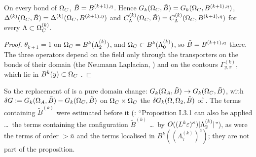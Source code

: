 \begin{lemma}\label{lem:a07:C51}
On every bond of $\Omega_{C}$, $\tilde B=B^{(k+1),\eta}$. Hence $G_k(\Omega_{C},\tilde B)=G_k(\Omega_{C},B^{(k+1),\eta})$, $\Delta^{(k)}(\Omega_{C},\tilde B)=\Delta^{(k)}(\Omega_{C},B^{(k+1),\eta})$ and $C^{(k)}_\Lambda(\Omega_{C},\tilde B)=C^{(k)}_\Lambda(\Omega_{C},B^{(k+1),\eta})$ for every $\Lambda\subset\Omega_{C}^{(k)}$.
\end{lemma}
\begin{proof}
$\theta_{k+1}=1$ on $\Omega_{C}=B^k(\Lambda^{(k)}_2)$, and $\Omega_{C}\subset B^k(\Lambda^{(k)}_0)$, so $\tilde B=B^{(k+1),\eta}$ there. The three operators depend on the field only through the transporters on the bonds of their domain (the Neumann Laplacian, \cite[(1.3)]{Ba4}) and on the contours $\Gamma^{(k)}_{y,x}$, which lie in $B^k(y)\subset\Omega_{C}$ \cite[(1.4)]{Ba4}.
\end{proof}
So the replacement of \cite[Prop.~2.6]{Ba2} is a pure domain change: $G_k(\Omega_{A},\tilde B)\to G_k(\Omega_{C},\tilde B)$, with $\delta G:= G_k(\Omega_{A},\tilde B)-G_k(\Omega_{C},\tilde B)$ on $\Omega_{C}\times\Omega_{C}$ the $\delta G_k(\Omega,\Omega_2,\tilde B)$ of \cite[p.~414]{Ba3}. The terms containing $\tilde B^{(k)}$ were estimated before it (\cite[p.~579]{Ba2}: ``Proposition I.3.1 can also be applied \dots\ the terms containing the configuration $\tilde B^{(k)}$ \dots\ by $O((L^k\varepsilon)^\kappa)|\Lambda^{(k)}_2|$''), as were the terms of order $>\bar n$ and the terms localised in $B^k((\Lambda^{(k)}_7)^c)$; they are not part of the proposition.

